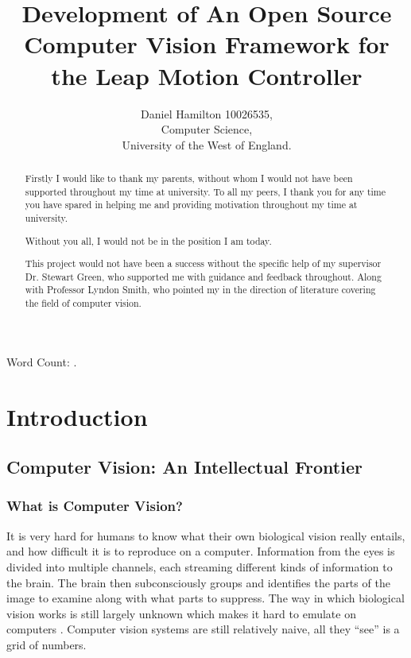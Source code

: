 \documentclass[11pt,oneside]{report}
\title{Development of An Open Source Computer Vision Framework for the Leap Motion Controller}
\author{Daniel Hamilton 10026535,\\Computer Science,\\University of the West of England.}
\begin{document}
	\maketitle
	
	\begin{abstract}
	
	\end{abstract}	
	
	\renewcommand{\abstractname}{Acknowledgements}
	\begin{abstract}
	\begin{center}
	Firstly I would like to thank my parents, without whom I would not have been supported throughout my time at university.
	To all my peers, I thank you for any time you have spared in helping me and providing motivation throughout my time at university.
	
	Without you all, I would not be in the position I am today.
	
	This project would not have been a success without the specific help of my supervisor Dr. Stewart Green, who supported me with guidance and feedback throughout.
	Along with Professor Lyndon Smith, who pointed my in the direction of literature covering the field of computer vision.
	\end{center}
	\end{abstract}
	
	\tableofcontents
	\listoffigures
	\listoftables
	\renewcommand{\lstlistlistingname}{List of Listings}
	\lstlistoflistings

	Word Count: \bashStdout.

	\chapter{Introduction}\label{chap:introduction}
		\section{Computer Vision: An Intellectual Frontier}
			\subsection{What is Computer Vision?}		
				
				It is very hard for humans to know what their own biological vision really entails, and how difficult it is to reproduce on a computer.
				Information from the eyes is divided into multiple channels, each streaming different kinds of information to the brain.
				The brain then subconsciously groups and identifies the parts of the image to examine along with what parts to suppress.
				The way in which biological vision works is still largely unknown which makes it hard to emulate on computers \cite[p. xi]{book:multiViewGeo}.				
				Computer vision systems are still relatively naive, all they ``see'' is a grid of numbers.%
				
\end{document}
